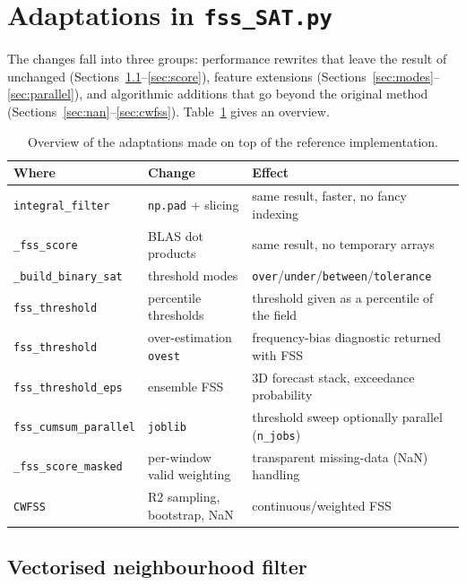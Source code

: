 \section{Adaptations in \texttt{fss\_SAT.py}}
\label{sec:adaptations}

The changes fall into three groups: performance rewrites that leave the result
of \citet{faggian2015} unchanged (Sections~\ref{sec:filter}--\ref{sec:score}),
feature extensions (Sections~\ref{sec:modes}--\ref{sec:parallel}), and
algorithmic additions that go beyond the original method
(Sections~\ref{sec:nan}--\ref{sec:cwfss}). Table~\ref{tab:overview} gives an
overview.

\begin{table}[ht!]
\centering
\renewcommand{\arraystretch}{1.25}
\begin{tabularx}{\textwidth}{l l X}
\toprule
\textbf{Where} & \textbf{Change} & \textbf{Effect} \\
\midrule
\texttt{integral\_filter}   & \texttt{np.pad} + slicing   & same result, faster, no fancy indexing \\
\texttt{\_fss\_score}        & BLAS dot products           & same result, no temporary arrays \\
\texttt{\_build\_binary\_sat} & threshold modes            & \texttt{over}/\texttt{under}/\texttt{between}/\texttt{tolerance} \\
\texttt{fss\_threshold}      & percentile thresholds       & threshold given as a percentile of the field \\
\texttt{fss\_threshold}      & over-estimation \texttt{ovest} & frequency-bias diagnostic returned with FSS \\
\texttt{fss\_threshold\_eps} & ensemble FSS                & 3D forecast stack, exceedance probability \\
\texttt{fss\_cumsum\_parallel} & \texttt{joblib}           & threshold sweep optionally parallel (\texttt{n\_jobs}) \\
\texttt{\_fss\_score\_masked} & per-window valid weighting & transparent missing-data (NaN) handling \\
\texttt{CWFSS}               & R2 sampling, bootstrap, NaN & continuous/weighted FSS \\
\bottomrule
\end{tabularx}
\caption{Overview of the adaptations made on top of the \citet{faggian2015}
reference implementation.}
\label{tab:overview}
\end{table}

\subsection{Vectorised neighbourhood filter}
\label{sec:filter}


